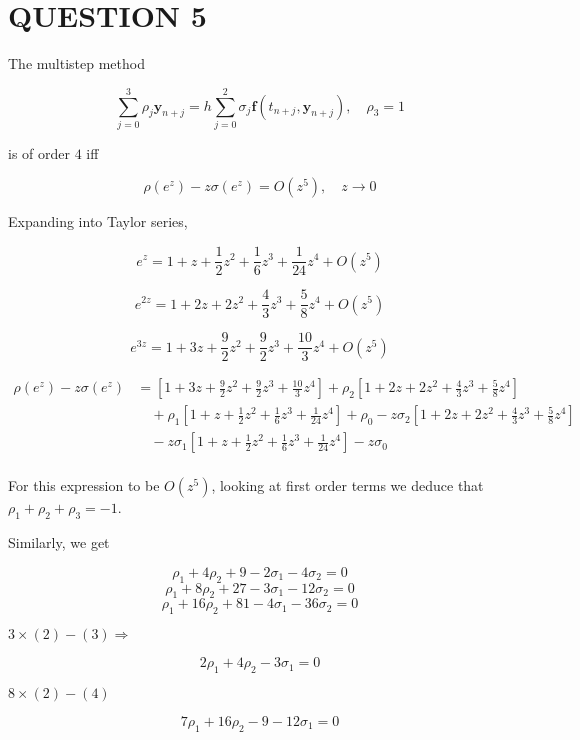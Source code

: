 \documentclass[a4paper]{article}
\begin{document}
\section{QUESTION 5}

The multistep method

\[ \sum_{j=0}^{3} \rho_{j} \mathbf{y}_{n+j} = h \sum_{j=0}^{2} \sigma_{j} \mathbf{f}(t_{n+j}, \mathbf{y}_{n+j} ), \quad \rho_{3} = 1 \]

is of order $ 4 $ iff

\[ \rho(e^{z}) - z \sigma(e^{z}) = O(z^{5}), \quad z \to 0 \]

Expanding into Taylor series,


\[ e^{z} = 1 + z + \frac{1}{2} z^{2} + \frac{1}{6} z^{3} + \frac{1}{24} z^{4} + O(z^{5}) \]

\[ e^{2z} = 1 + 2z + 2z^{2} + \frac{4}{3} z^{3} + \frac{5}{8} z^{4} + O(z^{5})  \]

\[ e^{3z} = 1 + 3z + \frac{9}{2} z^{2} + \frac{9}{2} z^{3} + \frac{10}{3} z^{4} + O(z^{5})    \]

\begin{align*}
\rho(e^{z}) - z \sigma(e^{z}) & = [1 + 3z + \frac{9}{2} z^{2} + \frac{9}{2} z^{3} + \frac{10}{3} z^{4}] + \rho_{2} [1 + 2z + 2z^{2} + \frac{4}{3} z^{3} + \frac{5}{8} z^{4}] \\
& \quad + \rho_{1} [1 + z + \frac{1}{2} z^{2} + \frac{1}{6} z^{3} + \frac{1}{24} z^{4}] + \rho_{0} - z \sigma_{2} \left[  1 + 2z + 2z^{2} + \frac{4}{3} z^{3} + \frac{5}{8} z^{4} \right]    \\
& \quad - z \sigma_{1} \left[  1 + z + \frac{1}{2} z^{2} + \frac{1}{6} z^{3} + \frac{1}{24} z^{4} \right]  - z \sigma_{0} \\
\end{align*}

For this expression to be $ O(z^{5}) $, looking at first order terms we deduce that $ \rho_{1} + \rho_{2} + \rho_{3} = - 1 $. 

Similarly, we get 

\[ \rho_{1} + 4 \rho_{2} + 9 - 2 \sigma_{1} - 4 \sigma_{2} = 0  \]
\[ \rho_{1} + 8 \rho_{2} + 27 - 3 \sigma_{1} - 12 \sigma_{2} = 0  \]
\[ \rho_{1} + 16 \rho_{2} + 81 - 4 \sigma_{1} - 36 \sigma_{2} = 0  \]

$ 3 \times (2) - (3) \Rightarrow $

\[ 2 \rho_{1} + 4 \rho_{2} - 3 \sigma_{1} = 0 \]

$  8 \times (2) - (4) $

\[ 7 \rho_{1} + 16 \rho_{2} - 9 - 12 \sigma_{1} = 0\]
\end{document}
